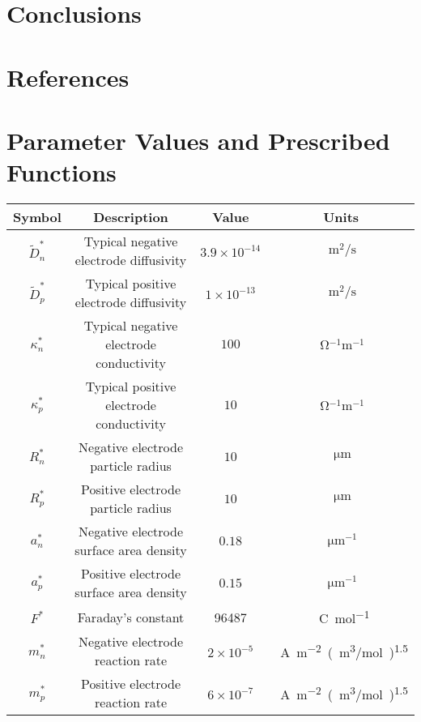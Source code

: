 \documentclass[preprint]{elsarticle}
\begin{document}
\section{Conclusions} 



\section*{References}

\appendix

\section{Parameter Values and Prescribed Functions}\label{app:paraFun}

\begin{table}[h]
	\centering 
	\begin{tabular}{|c|c|c|c|}\hline
  		Symbol & Description & Value & Units \\ \hline
        $\tilde{D}_n^*$ & Typical negative electrode diffusivity & $3.9\times10^{-14}$ & $\SI{}{\metre^{2}/\second}$\\ 
        $\tilde{D}_p^*$ & Typical positive electrode diffusivity & $1\times10^{-13}$ & $\SI{}{\metre^{2}/\second}$ \\ 
        $\kappa_n^*$ & Typical negative electrode conductivity & $100$ & $\SI{}{\ohm^{-1}\metre^{-1}}$ \\ 
        $\kappa_p^*$ & Typical positive electrode conductivity & $10$ & $\SI{}{\ohm^{-1}\metre^{-1}}$ \\ 
        $R_n^*$ & Negative electrode particle radius & $10$ & $\SI{}{\micro\metre}$  \\
        $R_p^*$ & Positive electrode particle radius & $10$ & $\SI{}{\micro\metre}$  \\
        $a_n^*$ & Negative electrode surface area density & $0.18$ & $\SI{}{\micro\metre^{-1}}$ \\ 
        $a_p^*$ & Positive electrode surface area density & $0.15$ & $\SI{}{\micro\metre^{-1}}$ \\ 
        $F^*$ & Faraday's constant & 96487 & \SI{}{\coulomb \mol^{-1}}\\ 
        $m_n^*$ & Negative electrode reaction rate & $2\times 10^{-5}$ & \SI{}{\ampere \metre^{-2} (\metre^3/\mol)^{1.5}} \\
        $m_p^*$ & Positive electrode reaction rate & $6\times 10^{-7}$ & \SI{}{\ampere \metre^{-2} (\metre^3/\mol)^{1.5}}\\

\end{tabular}
\end{table}
\end{document}
